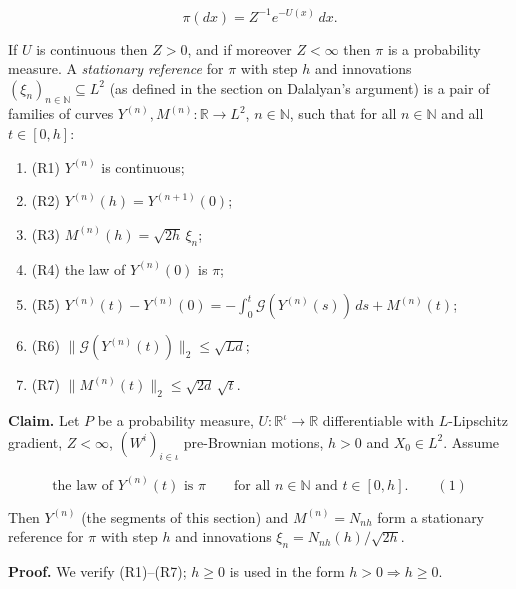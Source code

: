 \documentclass[11pt,a4paper]{article}
\begin{document}
\[\pi(dx)=Z^{-1}e^{-U(x)}\,dx .\]


If \(U\) is continuous then \(Z>0\), and if moreover \(Z<\infty\) then \(\pi\) is a probability measure. A \emph{stationary reference} for \(\pi\) with step \(h\) and innovations \((\xi_n)_{n\in\mathbb N}\subseteq L^2\) (as defined in the section on Dalalyan's argument) is a pair of families of curves \(Y^{(n)},M^{(n)}:\mathbb R\to L^2\), \(n\in\mathbb N\), such that for all \(n\in\mathbb N\) and all \(t\in[0,h]\):



\begin{enumerate}


\item (R1) \(Y^{(n)}\) is continuous;

\item (R2) \(Y^{(n)}(h)=Y^{(n+1)}(0)\);

\item (R3) \(M^{(n)}(h)=\sqrt{2h}\,\xi_n\);

\item (R4) the law of \(Y^{(n)}(0)\) is \(\pi\);

\item (R5) \(Y^{(n)}(t)-Y^{(n)}(0)=-\int_0^t\mathcal G(Y^{(n)}(s))\,ds+M^{(n)}(t)\);

\item (R6) \(\|\mathcal G(Y^{(n)}(t))\|_2\le\sqrt{Ld}\);

\item (R7) \(\|M^{(n)}(t)\|_2\le\sqrt{2d}\,\sqrt t\).

\end{enumerate}



\textbf{Claim.} Let \(P\) be a probability measure, \(U:\mathbb R^\iota\to\mathbb R\) differentiable with \(L\)-Lipschitz gradient, \(Z<\infty\), \((W^i)_{i\in\iota}\) pre-Brownian motions, \(h>0\) and \(X_0\in L^2\). Assume


\[\text{the law of }Y^{(n)}(t)\text{ is }\pi\qquad\text{for all }n\in\mathbb N\text{ and }t\in[0,h].\qquad(1)\]


Then \(Y^{(n)}\) (the segments of this section) and \(M^{(n)}=N_{nh}\) form a stationary reference for \(\pi\) with step \(h\) and innovations \(\xi_n=N_{nh}(h)/\sqrt{2h}\).




\textbf{Proof.} We verify (R1)–(R7); \(h\ge0\) is used in the form \(h>0\Rightarrow h\ge0\).
\end{document}
